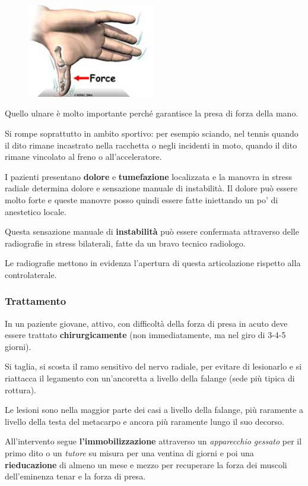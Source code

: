 \begin{figure}[!ht]
\centering
\includegraphics[width=0.5\textwidth]{004/image12.jpeg}
\end{figure}

Quello ulnare è molto importante perché garantisce la presa di forza della mano.

Si rompe soprattutto in ambito sportivo: per esempio sciando, nel tennis quando il dito rimane incastrato nella racchetta o negli incidenti in moto, quando il dito rimane vincolato al freno o all'acceleratore.

I pazienti presentano \textbf{dolore} e \textbf{tumefazione} localizzata e la manovra in stress radiale determina dolore e sensazione manuale di instabilità. Il dolore può essere molto forte e queste manovre posso quindi essere fatte iniettando un po' di anestetico locale.

Questa sensazione manuale di \textbf{instabilità} può essere confermata attraverso delle radiografie in stress bilaterali, fatte da un bravo tecnico radiologo.

Le radiografie mettono in evidenza l'apertura di questa articolazione rispetto alla controlaterale.

\subsubsection{Trattamento}

In un paziente giovane, attivo, con difficoltà della forza di presa in acuto deve essere trattato \textbf{chirurgicamente} (non immediatamente,
ma nel giro di 3-4-5 giorni).

Si taglia, si scosta il ramo sensitivo del nervo radiale, per evitare di lesionarlo e si riattacca il legamento con un'ancoretta a livello della falange (sede più tipica di rottura).

Le lesioni sono nella maggior parte dei casi a livello della falange, più raramente a livello della testa del metacarpo e ancora più raramente lungo il suo decorso.

All'intervento segue \textbf{l'immobilizzazione} attraverso un \emph{apparecchio gessato} per il primo dito o un \emph{tutore} su misura per una ventina di giorni e poi una \textbf{rieducazione} di
almeno un mese e mezzo per recuperare la forza dei muscoli dell'eminenza tenar e la forza di presa.
